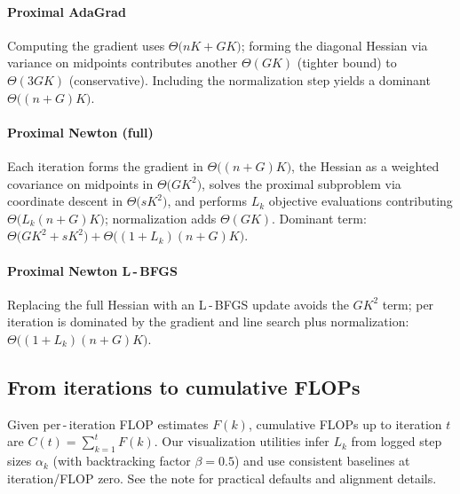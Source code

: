 \paragraph{Proximal AdaGrad} Computing the gradient uses $\Theta\big(nK + GK\big)$; forming the diagonal Hessian via variance on midpoints contributes another $\Theta(GK)$ (tighter bound) to $\Theta(3GK)$ (conservative). Including the normalization step yields a dominant $\Theta\big((n+G)K\big)$.

\paragraph{Proximal Newton (full)} Each iteration forms the gradient in $\Theta\big((n+G)K\big)$, the Hessian as a weighted covariance on midpoints in $\Theta\big(GK^2\big)$, solves the proximal subproblem via coordinate descent in $\Theta\big(sK^2\big)$, and performs $L_k$ objective evaluations contributing $\Theta\big(L_k (n+G)K\big)$; normalization adds $\Theta(GK)$. Dominant term: $\Theta\big(GK^2 + sK^2\big) + \Theta\big((1+L_k)(n+G)K\big)$.

\paragraph{Proximal Newton L\,-\,BFGS} Replacing the full Hessian with an L\,-\,BFGS update avoids the $GK^2$ term; per iteration is dominated by the gradient and line search plus normalization: $\Theta\big((1+L_k)(n+G)K\big)$.

\subsection{From iterations to cumulative FLOPs}
Given per\,-\,iteration FLOP estimates $F(k)$, cumulative FLOPs up to iteration $t$ are $C(t) = \sum_{k=1}^t F(k)$. Our visualization utilities infer $L_k$ from logged step sizes $\alpha_k$ (with backtracking factor $\beta=0.5$) and use consistent baselines at iteration/FLOP zero. See the note for practical defaults and alignment details.

